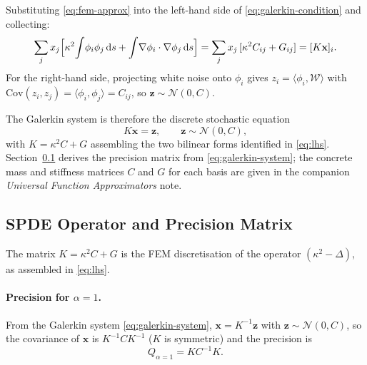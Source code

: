 \documentclass[11pt]{article}
\begin{document}
Substituting \eqref{eq:fem-approx} into the left-hand side of
\eqref{eq:galerkin-condition} and collecting:
\begin{equation}
  \sum_j x_j \Bigl[\kappa^2\!\int\!\phi_i\phi_j\,\mathrm{d} s
                  +\int\!\nabla\phi_i\cdot\nabla\phi_j\,\mathrm{d} s\Bigr]
  = \sum_j x_j\,[\kappa^2 C_{ij} + G_{ij}]
  = [K\mathbf{x}]_i.
  \label{eq:lhs}
\end{equation}
For the right-hand side, projecting white noise onto $\phi_i$ gives
$z_i = \langle\phi_i,\mathcal{W}\rangle$ with
$\mathrm{Cov}(z_i,z_j)=\langle\phi_i,\phi_j\rangle=C_{ij}$,
so $\mathbf{z}\sim\mathcal{N}(0,C)$.

The Galerkin system is therefore the discrete stochastic equation
\begin{equation}
  K\mathbf{x} = \mathbf{z}, \qquad \mathbf{z}\sim\mathcal{N}(0,C),
  \label{eq:galerkin-system}
\end{equation}
with $K=\kappa^2 C+G$ assembling the two bilinear forms identified in
\eqref{eq:lhs}.  Section~\ref{sec:spde-op} derives the precision matrix from
\eqref{eq:galerkin-system}; the concrete mass and stiffness matrices $C$ and $G$
for each basis are given in the companion \emph{Universal Function Approximators}
note.

\subsection{SPDE Operator and Precision Matrix}
\label{sec:spde-op}

The matrix $K = \kappa^2 C + G$ is the FEM discretisation of the operator
$(\kappa^2 - \Delta)$, as assembled in \eqref{eq:lhs}.

\paragraph{Precision for $\alpha=1$.}
From the Galerkin system \eqref{eq:galerkin-system}, $\mathbf{x}=K^{-1}\mathbf{z}$
with $\mathbf{z}\sim\mathcal{N}(0,C)$, so the covariance of $\mathbf{x}$ is
$K^{-1}CK^{-1}$ ($K$ is symmetric) and the precision is
\begin{equation}
  Q_{\alpha=1} = K C^{-1} K.
  \label{eq:Q1}
\end{equation}
\end{document}
